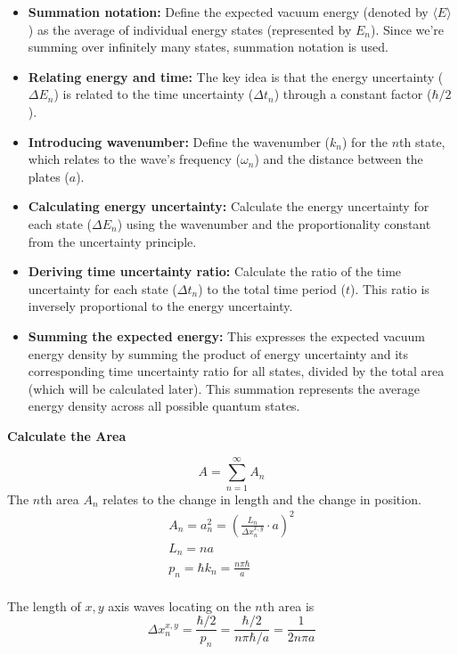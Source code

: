 \begin{itemize}
    \item \textbf{Summation notation:} Define the expected vacuum energy (denoted by $\langle E \rangle$ ) 
    as the average of individual energy states (represented by $E_n$). 
    Since we're summing over infinitely many states, summation notation is used.
    \item \textbf{Relating energy and time:} The key idea is that the energy uncertainty ($\Delta E_n$) is related 
    to the time uncertainty ($\Delta t_n$) through a constant factor ($\hbar/2$).
    \item \textbf{Introducing wavenumber:} Define the wavenumber ($k_n$) for the $n$th state, 
    which relates to the wave's frequency ($\omega_n$) and the distance between the plates ($a$).
    \item \textbf{Calculating energy uncertainty:} Calculate the energy uncertainty for each state ($\Delta E_n$)
     using the wavenumber and the proportionality constant from the uncertainty principle.
    \item \textbf{Deriving time uncertainty ratio:} Calculate the ratio of the time uncertainty for each state ($\Delta t_n$)
     to the total time period ($t$). This ratio is inversely proportional to the energy uncertainty.
    \item \textbf{Summing the expected energy:} This expresses the expected vacuum energy density by summing 
    the product of energy uncertainty and its corresponding time uncertainty ratio for all states, 
    divided by the total area (which will be calculated later). 
    This summation represents the average energy density across all possible quantum states.
\end{itemize}
\noindent\textbf{Calculate the Area}
\par
\[A = \sum_{n=1}^{\infty}A_n\]
The \(n\)th area \(A_n\) relates to the change in length and the change in position.
    \begin{align*}
    &A_n = a_n^2 = (\frac{L_n}{\Delta x_n^{x,y}} \cdot a)^2&\\
    &L_n = n a&\\
    &p_n = \hbar k_n = \frac{n \pi \hbar}{a}&\\
    \end{align*}
    
    The length of $x, y$ axis waves locating on the $n$th area is
    \[\Delta x_n^{x, y} = \frac{\hbar/2}{p_n} = \frac{\hbar/2}{n \pi \hbar/a} = \frac{1}{2 n \pi a}\]
    
